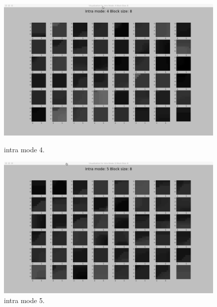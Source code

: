 \begin{figure}[H]

    \vspace*{1cm} %
    
    \begin{minipage}{0.49\textwidth}
        \includegraphics[width=\linewidth]{Figures/visu-size8x8/8-4}
        \caption[Intra mode 4]{intra mode 4.}
        \label{fig:size8_mode4}
    \end{minipage}
    \hspace{\fill} %
    \begin{minipage}{0.49\textwidth}
        \includegraphics[width=\linewidth]{Figures/visu-size8x8/8-5}
        \caption[Intra mode 5]{intra mode 5.}
        \label{fig:size8_mode5}
    \end{minipage}

    \vspace*{1cm} %


\end{figure}
